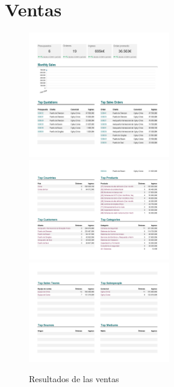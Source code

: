 \documentclass{report}
\begin{document}
        \section*{Ventas}
            \begin{figure}[H]
                \centering
                \includegraphics[width=0.55\textwidth]{./img/Ventas1.png}
                \includegraphics[width=0.55\textwidth]{./img/Ventas2.png}
                \includegraphics[width=0.55\textwidth]{./img/Ventas3.png}
                \caption{Resultados de las ventas}
            \end{figure}
\end{document}

